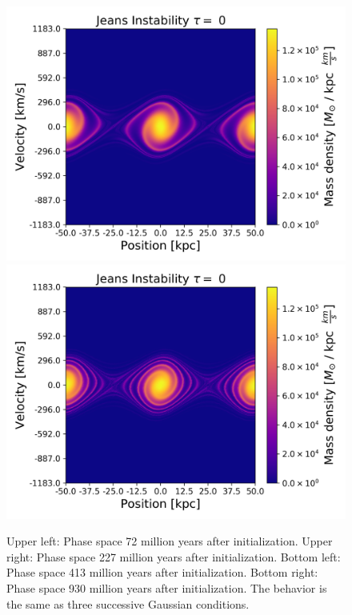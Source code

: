 \begin{figure}[h!]
    \includegraphics[scale=0.45]{imag/jeans40.png}
    \includegraphics[scale=0.45]{imag/jeans90.png}
    \caption{Upper left: Phase space 72 million years after initialization. Upper right: Phase space 227 million years after initialization. Bottom left: Phase space 413 million years after initialization. Bottom right: Phase space 930 million years after initialization. The behavior is the same as three successive Gaussian conditions.}
    \label{1dJeans}
\end{figure}


\newpage
